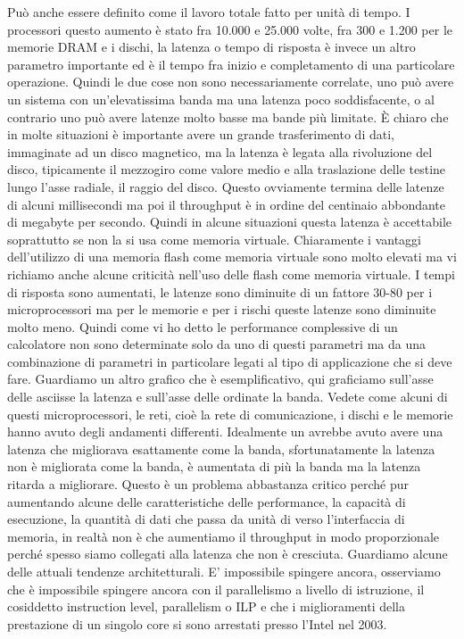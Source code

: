 Può anche essere definito come il lavoro totale fatto per unità di tempo.
I processori questo aumento è stato fra 10.000 e 25.000 volte, fra 300 e 1.200 per le memorie DRAM e i dischi, la latenza o tempo di risposta è invece un altro parametro importante ed è il tempo fra inizio e completamento di una particolare operazione.
Quindi le due cose non sono necessariamente correlate, uno può avere un sistema con un'elevatissima banda ma una latenza poco soddisfacente, o al contrario uno può avere latenze molto basse ma bande più limitate.
È chiaro che in molte situazioni è importante avere un grande trasferimento di dati, immaginate ad un disco magnetico, ma la latenza è legata alla rivoluzione del disco, tipicamente il mezzogiro come valore medio e alla traslazione delle testine lungo l'asse radiale, il raggio del disco.
Questo ovviamente termina delle latenze di alcuni millisecondi ma poi il throughput è in ordine del centinaio abbondante di megabyte per secondo.
Quindi in alcune situazioni questa latenza è accettabile soprattutto se non la si usa come memoria virtuale.
Chiaramente i vantaggi dell'utilizzo di una memoria flash come memoria virtuale sono molto elevati ma vi richiamo anche alcune criticità nell'uso delle flash come memoria virtuale.
I tempi di risposta sono aumentati, le latenze sono diminuite di un fattore 30-80 per i microprocessori ma per le memorie e per i rischi queste latenze sono diminuite molto meno.
Quindi come vi ho detto le performance complessive di un calcolatore non sono determinate solo da uno di questi parametri ma da una combinazione di parametri in particolare legati al tipo di applicazione che si deve fare.
Guardiamo un altro grafico che è esemplificativo, qui graficiamo sull'asse delle asciisse la latenza e sull'asse delle ordinate la banda.
Vedete come alcuni di questi microprocessori, le reti, cioè la rete di comunicazione, i dischi e le memorie hanno avuto degli andamenti differenti.
Idealmente un avrebbe avuto avere una latenza che migliorava esattamente come la banda, sfortunatamente la latenza non è migliorata come la banda, è aumentata di più la banda ma la latenza ritarda a migliorare.
Questo è un problema abbastanza critico perché pur aumentando alcune delle caratteristiche delle performance, la capacità di esecuzione, la quantità di dati che passa da unità di verso l'interfaccia di memoria, in realtà non è che aumentiamo il throughput in modo proporzionale perché spesso siamo collegati alla latenza che non è cresciuta.
Guardiamo alcune delle attuali tendenze architetturali.
E' impossibile spingere ancora, osserviamo che è impossibile spingere ancora con il parallelismo a livello di istruzione, il cosiddetto instruction level, parallelism o ILP e che i miglioramenti della prestazione di un singolo core si sono arrestati presso l'Intel nel 2003.

